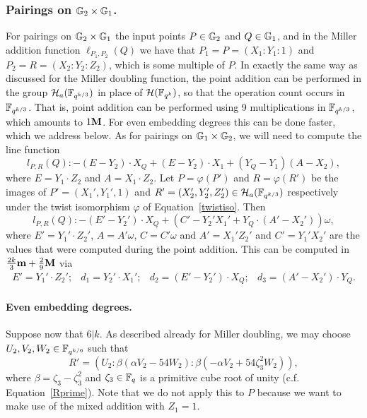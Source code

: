 \subsubsection{Pairings on $\mathbb{G}_{2} \times \mathbb{G}_{1}$.}

For pairings on $\mathbb{G}_{2} \times \mathbb{G}_{1}$ the input points $P \in \mathbb{G}_{2}$ and $Q \in \mathbb{G}_{1}$, and in the Miller addition function $\ell_{P_1,P_2}(Q)$ we have that
$P_1 = P = (X_1:Y_1:1)$ and $P_2 = R = (X_2:Y_2:Z_2)$, which is some multiple of $P$. 
In exactly the same way as discussed for the Miller doubling function,
the point addition can be performed in the group $\mathcal{H}_a(\mathbb{F}_{q^{k/3}})$
in place of $\mathcal{H}(\mathbb{F}_{q^k})$, so that the operation count occurs in
$\mathbb{F}_{q^{k/3}}$. That is, point addition can be performed using 9 multiplications in 
$\mathbb{F}_{q^{k/3}}$, which amounts to $1\textbf{M}$. 
For even embedding degrees this can be done faster, which we address below.
As for pairings on $\mathbb{G}_{1} \times \mathbb{G}_{2}$, we will need to compute the line function
$$l_{P,R}(Q): - (E - Y_2) \cdot X_{Q} + (E - Y_2) \cdot X_1 + (Y_{Q}-Y_1)(A-X_2), $$
where $E = Y_1 \cdot Z_2$ and $A = X_1 \cdot Z_2$.
Let $P = \varphi(P')$ and $R = \varphi(R')$ be the images of 
$P' = (X_1',Y_1',1)$ and $R' = (X_2',Y_2',Z_2') \in \mathcal{H}_a(\mathbb{F}_{q^{k/3}})$ respectively
under the twist isomorphism $\varphi$ of Equation~\ref{twistiso}.
Then 
$$l_{P,R}(Q): - (E' - Y_2') \cdot X_{Q} + (C'-Y_2'X_1' + Y_Q \cdot (A'-X_2'))\omega, $$
where $E' = Y_1' \cdot Z_2'$, $A = A'\omega$, $C = C'\omega$ and 
$A' = X_1'Z_2'$ and $C' = Y_1'X_2'$ are the values that were computed during the point addition.
This can be computed in 
$\frac{2k}{3}\textbf{m} + \frac{2}{9}\textbf{M}$
via
\[\begin{array}{cccc}
E' = Y_1' \cdot Z_2'; &
d_1 = Y_2' \cdot X_1'; &
d_2 = (E' - Y_2') \cdot X_Q; &
d_3 = (A' - X_2')\cdot Y_Q.
\end{array}\]

\paragraph*{Even embedding degrees.}

Suppose now that $6 | k$.
As described already for Miller doubling, we may choose $U_2,V_2,W_2 \in \mathbb{F}_{q^{k/6}}$ such that
\[ R' = (U_2:\beta(\alpha V_2 - 54W_2) : \beta(-\alpha V_2 + 54\zeta_3^2 W_2)),
\]
where $\beta = \zeta_3-\zeta_3^2$ and 
$\zeta_3 \in \mathbb{F}_{q}$ is a primitive cube root of unity (c.f. Equation~\ref{Rprime}). 
Note that we do not apply this to $P$ because we want to make use of the mixed addition with $Z_1 = 1$.

